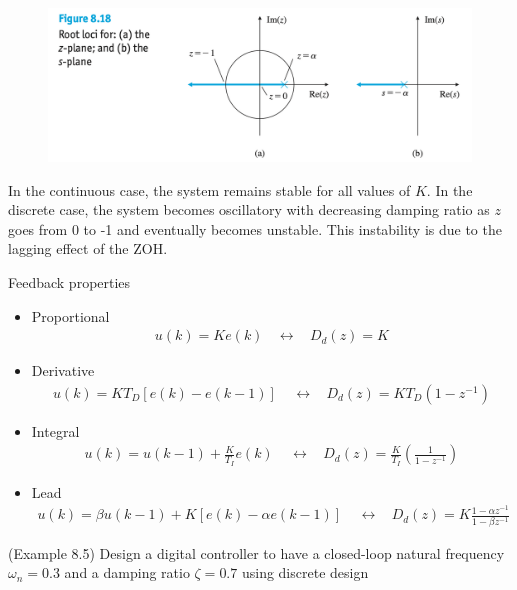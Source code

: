 \begin{figure}[h]
	\includegraphics[width=12cm]{./FIG_Franklin/fig8-18.png}
\end{figure}

In the continuous case, the system remains stable for all values of $K$. 
In the discrete case, the system becomes oscillatory with decreasing damping ratio as $z$ goes from 0 to -1 and eventually becomes unstable. This instability is due to the lagging effect of the ZOH. 

%
\newpage
%
Feedback properties 
\begin{itemize}
	\item Proportional 
	\begin{align*}
		u(k) = Ke(k) ~~~~\leftrightarrow~~~~ D_d(z) = K 
	\end{align*}
	\item Derivative 
	\begin{align*}
		u(k) = K T_D [e(k) - e(k-1)] ~~~~~\leftrightarrow~~~~ D_d(z) = KT_D (1-z^{-1})
	\end{align*}
	\item Integral 
	\begin{align*}
		u(k) = u(k-1) + \frac{K}{T_I} e(k) ~~~~~\leftrightarrow~~~~ D_d(z) = \frac{K}{T_I} \left( \frac{1}{1-z^{-1}} \right) 
	\end{align*}
	\item Lead 
	\begin{align*}
		u(k) = \beta u(k-1) + K [e(k) - \alpha e(k-1)] ~~~~~\leftrightarrow~~~~ D_d(z) = K \frac{1- \alpha z^{-1}}{1-\beta z^{-1}} 
	\end{align*}
\end{itemize}
%
%
\newpage
%
%
\newpage
%
(Example 8.5)  Design a digital controller to have a closed-loop natural frequency $\omega_n = 0.3$ and a damping ratio $\zeta = 0.7$ using discrete design


